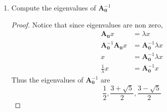 \documentclass[11pt]{scrartcl}
\begin{document}
\begin{enumerate}[label=\alph*.]
{\begin{proof}
\begin{align*}
			                                                & = -(\lambda -2)(\lambda^2 - 3 \lambda +1)
		      \end{align*}
		      We compute when $-(\lambda -2)(\lambda^2 - 3 \lambda +1) = 0$.
		      When $\lambda = 2$, the characteristic polynomial equals $0$.
		      Using the quadratic formula, when $\lambda = \frac{3 \pm \sqrt{5}}{2}$, the characteristic polynomial equals $0$.
		      Hence the eigenvalues of $\mathbf{A}_{\mathbf{0}}$ are $$2, \frac{3 + \sqrt{5}}{2}, \frac{3 - \sqrt{5}}{2}$$
		      We can rewrite the characteristic polynomial as
		      $$ f(\lambda) = -(\lambda -2)(\lambda - \frac{3 + \sqrt{5}}{2})(\lambda - \frac{3 - \sqrt{5}}{2})$$
		      Using the "Test for Diagonalization" outlined in pg 269,  we determine if
		      $\mathbf{A}_{\mathbf{0}}$ can be diagonalized.
		      It is clear that the first condition, the characteristic polynomial of T splits, holds.
		      By Theorem 5.7, condition 2 is automatically satisfied for eigenvalues
		      of multiplicity 1. Therefore, A is diagonalizable.
	      \end{proof}
	      }
	\item{
	      Compute the eigenvalues of $\mathbf{A}_{\mathbf{0}}^{-1}$
	      \begin{proof}
		      Notice that since eigenvalues are non zero,
		      \begin{align*}
			      \mathbf{A}_{\mathbf{0}} x                              & = \lambda x                             \\
			      \mathbf{A}_{\mathbf{0}}^{-1} \mathbf{A}_{\mathbf{0}} x & = \mathbf{A}_{\mathbf{0}}^{-1}\lambda x \\
			      x                                                      & = \mathbf{A}_{\mathbf{0}}^{-1}\lambda x \\
			      \frac{1}{\lambda}x                                     & = \mathbf{A}_{\mathbf{0}}^{-1} x
		      \end{align*}
		      Thus the eigenvalues of $\mathbf{A}_{\mathbf{0}}^{-1}$ are
		      $$\frac12, \frac{3 + \sqrt{5}}{2}, \frac{3 - \sqrt{5}}{2}$$
	      \end{proof}
	      }
\end{enumerate}
\end{document}
